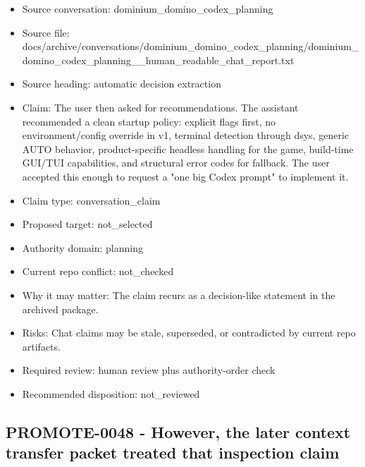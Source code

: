 \documentclass[11pt,a4paper]{report}
\begin{document}
\begin{itemize}
\item Source conversation: dominium\_domino\_codex\_planning
\item Source file: docs/archive/conversations/dominium\_domino\_codex\_planning/dominium\_domino\_codex\_planning\_\_human\_readable\_chat\_report.txt
\item Source heading: automatic decision extraction
\item Claim: The user then asked for recommendations. The assistant recommended a clean startup policy: explicit flags first, no environment/config override in v1, terminal detection through dsys, generic AUTO behavior, product-specific headless handling for the game, build-time GUI/TUI capabilities, and structural error codes for fallback. The user accepted this enough to request a "one big Codex prompt" to implement it.
\item Claim type: conversation\_claim
\item Proposed target: not\_selected
\item Authority domain: planning
\item Current repo conflict: not\_checked
\item Why it may matter: The claim recurs as a decision-like statement in the archived package.
\item Risks: Chat claims may be stale, superseded, or contradicted by current repo artifacts.
\item Required review: human review plus authority-order check
\item Recommended disposition: not\_reviewed
\end{itemize}

\subsection{PROMOTE-0048 - However, the later context transfer packet treated that inspection claim}
\end{document}
